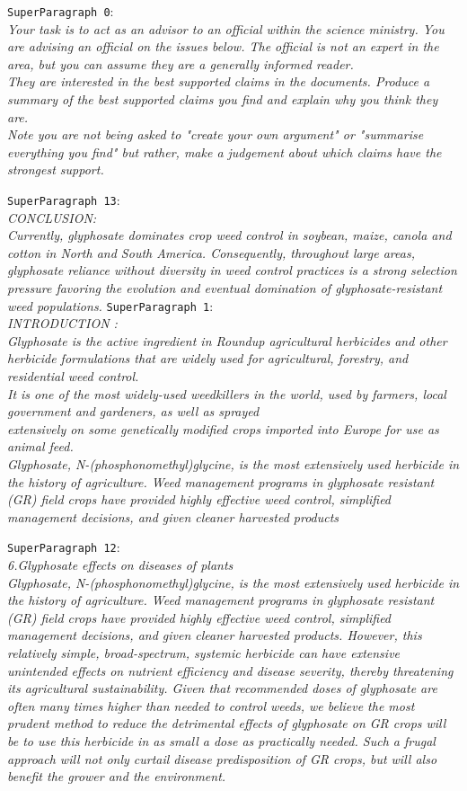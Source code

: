 \texttt{SuperParagraph 0}:\\
\textit{Your task is to act as an advisor to an official within the science  ministry. You are advising an official on the issues below. 
The official  is not an expert in the area, but you can assume they are a generally  informed reader.\\
They are interested in the best supported claims in the  documents. Produce a summary of the best supported claims you find and explain why you think they are.\\
Note you are not being asked to "create your own argument" or  "summarise everything you find" but rather, make a judgement about which  claims have the strongest support.}

\texttt{SuperParagraph 13}:\\
\textit{CONCLUSION:\\
Currently, glyphosate dominates crop weed control in soybean, maize,  canola and cotton in North and South America. Consequently, throughout  large areas, glyphosate reliance without diversity in weed control  practices is a strong selection pressure favoring the evolution and  eventual domination of glyphosate-resistant weed populations.}
\newpage
\texttt{SuperParagraph 1}:\\
\textit{INTRODUCTION :\\
Glyphosate  is the active ingredient in Roundup agricultural herbicides and other  herbicide formulations that are widely used for agricultural, forestry,  and residential weed control.\\
It is one of the most widely-used weedkillers in the  world, used by farmers, local government and gardeners, as well as  sprayed\\
extensively on some genetically modified crops imported into  Europe for use as animal feed.\\
Glyphosate,  N-(phosphonomethyl)glycine, is the most extensively used herbicide in  the history of agriculture. Weed management programs in glyphosate  resistant (GR) field crops have provided highly effective weed control,  simplified management decisions, and given cleaner harvested products}

\texttt{SuperParagraph 12}:\\
\textit{6.Glyphosate effects on diseases of plants\\
Glyphosate, N-(phosphonomethyl)glycine, is the most extensively used  herbicide in the history of agriculture. Weed management programs in  glyphosate resistant (GR) field crops have provided highly effective  weed control, simplified management decisions, and given cleaner  harvested products. However, this relatively simple, broad-spectrum,  systemic herbicide can have extensive unintended effects on nutrient  efficiency and disease severity, thereby threatening its agricultural sustainability.  Given that  recommended doses of glyphosate are often many times higher than needed  to control weeds, we believe the most prudent method to reduce the  detrimental effects of glyphosate on GR crops will be to use this  herbicide in as small a dose as practically needed. Such a frugal  approach will not only curtail disease predisposition of GR crops, but  will also benefit the grower and the 
environment.}


